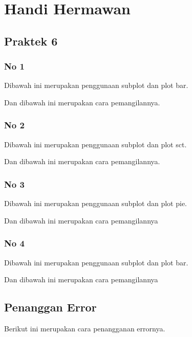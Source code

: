 \section{Handi Hermawan}
\subsection{Praktek 6}
\subsubsection{No 1}
\hfill \break
Dibawah ini merupakan penggunaan subplot dan plot bar.

Dan dibawah ini merupakan cara pemangilannya.


\subsubsection{No 2}
\hfill \break
Dibawah ini merupakan penggunaan subplot dan plot sct.

Dan dibawah ini merupakan cara pemangilannya.


\subsubsection{No 3}
\hfill \break
Dibawah ini merupakan penggunaan subplot dan plot pie.

Dan dibawah ini merupakan cara pemangilannya


\subsubsection{No 4}
\hfill \break
Dibawah ini merupakan penggunaan subplot dan plot bar.

Dan dibawah ini merupakan cara pemangilannya


\subsection{Penanggan Error}
\hfill \break
Berikut ini merupakan cara penangganan errornya.


